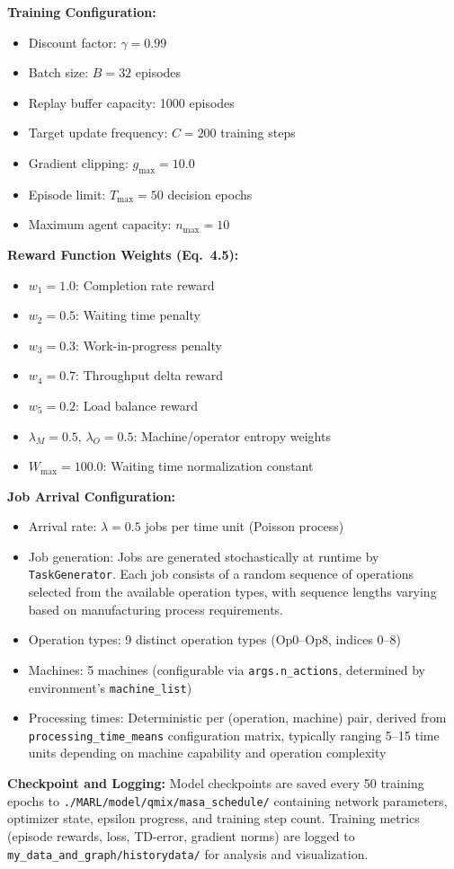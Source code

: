 \textbf{Training Configuration:}
\begin{itemize}
\item Discount factor: \(\gamma = 0.99\)
\item Batch size: \(B = 32\) episodes
\item Replay buffer capacity: 1000 episodes
\item Target update frequency: \(C = 200\) training steps
\item Gradient clipping: \(g_{\max} = 10.0\)
\item Episode limit: \(T_{\max} = 50\) decision epochs
\item Maximum agent capacity: \(n_{\max} = 10\)
\end{itemize}

\textbf{Reward Function Weights (Eq.~4.5):}
\begin{itemize}
\item \(w_1 = 1.0\): Completion rate reward
\item \(w_2 = 0.5\): Waiting time penalty
\item \(w_3 = 0.3\): Work-in-progress penalty
\item \(w_4 = 0.7\): Throughput delta reward
\item \(w_5 = 0.2\): Load balance reward
\item \(\lambda_M = 0.5\), \(\lambda_O = 0.5\): Machine/operator entropy weights
\item \(W_{\max} = 100.0\): Waiting time normalization constant
\end{itemize}

\textbf{Job Arrival Configuration:}
\begin{itemize}
\item Arrival rate: \(\lambda = 0.5\) jobs per time unit (Poisson process)
\item Job generation: Jobs are generated stochastically at runtime by \texttt{TaskGenerator}. Each job consists of a random sequence of operations selected from the available operation types, with sequence lengths varying based on manufacturing process requirements.
\item Operation types: 9 distinct operation types (Op0--Op8, indices 0--8)
\item Machines: 5 machines (configurable via \texttt{args.n\_actions}, determined by environment's \texttt{machine\_list})
\item Processing times: Deterministic per (operation, machine) pair, derived from \texttt{processing\_time\_means} configuration matrix, typically ranging 5--15 time units depending on machine capability and operation complexity
\end{itemize}

\textbf{Checkpoint and Logging:} Model checkpoints are saved every 50 training epochs to \texttt{./MARL/model/qmix/masa\_schedule/} containing network parameters, optimizer state, epsilon progress, and training step count. Training metrics (episode rewards, loss, TD-error, gradient norms) are logged to \texttt{my\_data\_and\_graph/historydata/} for analysis and visualization.
